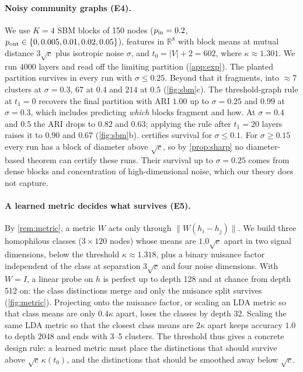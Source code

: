 \documentclass[10pt]{article}
\theoremstyle{definition}
\theoremstyle{remark}
\newcommand{\R}{\mathbb{R}}
\begin{document}
\paragraph{Noisy community graphs (E4).} We use $K=4$ SBM blocks of 150 nodes ($p_{\rm in}=0.2$, $p_{\rm out}\in\{0,0.005,0.01,0.02,0.05\}$),
features in $\R^8$ with block means at mutual distance $3\sqrt c$ plus isotropic noise $\sigma$, and $t_0=|V|+2=602$, where $\kappa\approx1.301$.
We run $4000$ layers and read off the limiting partition (\cref{app:exp}). The planted partition survives in every run with
$\sigma\le0.25$. Beyond that it fragments, into $\approx7$ clusters at $\sigma=0.3$, $67$ at $0.4$ and $214$ at $0.5$
(\cref{fig:sbm}c). The threshold-graph rule at $t_1=0$ recovers the final partition with ARI $1.00$ up to $\sigma=0.25$ and $0.99$ at
$\sigma=0.3$, which includes predicting \emph{which} blocks fragment and how. At $\sigma=0.4$ and $0.5$ the ARI drops to $0.82$ and $0.63$;
applying the rule after $t_1=20$ layers raises it to $0.90$ and $0.67$ (\cref{fig:sbm}b).  certifies survival for
$\sigma\le0.1$. For $\sigma\ge0.15$ every run has a block of diameter above $\sqrt c$, so by \cref{prop:sharp} no diameter-based theorem
can certify these runs. Their survival up to $\sigma=0.25$ comes from dense blocks and concentration of high-dimensional noise, which our
theory does not capture.

\paragraph{A learned metric decides what survives (E5).} By \cref{rem:metric}, a metric $W$ acts only through $\|W(h_i-h_j)\|$. We build three
homophilous classes ($3\times120$ nodes) whose means are $1.0\sqrt c$ apart in two signal dimensions, below the threshold
$\kappa\approx1.318$, plus a binary nuisance factor independent of the class at separation $3\sqrt c$ and four noise dimensions. With $W=I$,
a linear probe on $h$ is perfect up to depth 128 and at chance from depth 512 on: the class distinctions merge and only the nuisance split
survives (\cref{fig:metric}). Projecting onto the nuisance factor, or scaling an LDA metric so that class means are only $0.4\kappa$ apart,
loses the classes by depth 32. Scaling the same LDA metric so that the closest class means are $2\kappa$ apart keeps accuracy $1.0$ to depth
2048 and ends with 3--5 clusters. The threshold thus gives a concrete design rule: a learned metric must place the distinctions
that should survive above $\sqrt c\,\kappa(t_0)$, and the distinctions that should be smoothed away below $\sqrt c$.
\end{document}
